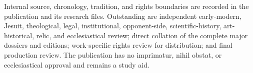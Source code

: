 Internal source, chronology, tradition, and rights boundaries are recorded in
the publication and its research files.  Outstanding are independent
early-modern, Jesuit, theological, legal, institutional, opponent-side,
scientific-history, art-historical, relic, and ecclesiastical review; direct
collation of the complete major dossiers and editions; work-specific rights
review for distribution; and final production review.  The publication has no
imprimatur, nihil obstat, or ecclesiastical approval and remains a study aid.
